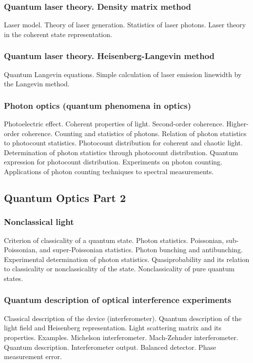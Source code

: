 \subsubsection{Quantum laser theory. Density matrix method}
Laser model. Theory of laser generation. Statistics of laser photons. Laser theory in the coherent state representation.
\subsubsection{Quantum laser theory. Heisenberg-Langevin method}
Quantum Langevin equations. Simple calculation of laser emission linewidth by the Langevin method.
\subsubsection{Photon optics (quantum phenomena in optics)}
Photoelectric effect.
Coherent properties of light.
Second-order coherence.
Higher-order coherence.
Counting and statistics of photons.
Relation of photon statistics to photocount statistics.
Photocount distribution for coherent and chaotic light.
Determination of photon statistics through photocount distribution.
Quantum expression for photocount distribution.
Experiments on photon counting. Applications of photon counting techniques to spectral measurements.

\subsection{Quantum Optics Part 2}
\subsubsection{Nonclassical light}
Criterion of classicality of a quantum state. Photon statistics. Poissonian, sub-Poissonian, and super-Poissonian statistics. Photon bunching and antibunching. Experimental determination of photon statistics. Quasiprobability and its relation to classicality or nonclassicality of the state. Nonclassicality of pure quantum states.
\subsubsection{Quantum description of optical interference experiments}
Classical description of the device (interferometer).
Quantum description of the light field and Heisenberg representation.
Light scattering matrix and its properties.
Examples. Michelson interferometer. Mach-Zehnder interferometer.
Quantum description. Interferometer output. Balanced detector. Phase measurement error.
